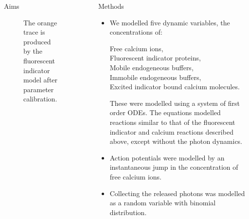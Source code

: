 \documentclass[final]{beamer}
\newlength{\sepwid}
\newlength{\onecolwid}
\begin{document}
\begin{frame}[t]
\begin{columns}[t]
\begin{column}{\onecolwid}
\begin{block}{Aims}
\begin{figure}
{The orange trace is produced by the fluorescent indicator model after parameter calibration.}
\end{figure}

\end{block}

\end{column} %


\begin{column}{\sepwid}\end{column} %

\begin{column}{\onecolwid}


\begin{block}{Methods}

\begin{itemize}
	\item We modelled five dynamic variables, the concentrations of:
		\begin{description}
			\item[\hspace{2cm}Free calcium ions,]
			\item[\hspace{2cm}Fluorescent indicator proteins,]
			\item[\hspace{2cm}Mobile endogeneous buffers,]
			\item[\hspace{2cm}Immobile endogeneous buffers,]
			\item[\hspace{2cm}Excited indicator bound calcium molecules.]
		\end{description}
		These were modelled using a system of first order ODEs. The equations modelled reactions similar to that of the fluorescent indicator and calcium reactions described above, except without the photon dynamics.
	\item Action potentials were modelled by an instantaneous jump in the concentration of free calcium ions.
	\item Collecting the released photons was modelled as a random variable with binomial distribution.
\end{itemize}


\end{block}
\end{column}
\end{columns}
\end{frame}
\end{document}
